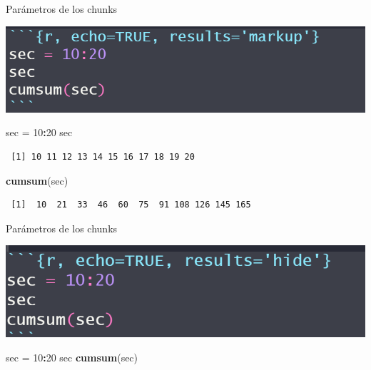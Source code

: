 \documentclass[
  ignorenonframetext,
  aspectratio=169]{beamer}
\newenvironment{Shaded}{\begin{snugshade}}{\end{snugshade}}
\newcommand{\DecValTok}[1]{\textcolor[rgb]{0.00,0.00,0.81}{#1}}
\newcommand{\FunctionTok}[1]{\textcolor[rgb]{0.13,0.29,0.53}{\textbf{#1}}}
\newcommand{\NormalTok}[1]{#1}
\newcommand{\OtherTok}[1]{\textcolor[rgb]{0.56,0.35,0.01}{#1}}
\newcommand{\SpecialCharTok}[1]{\textcolor[rgb]{0.81,0.36,0.00}{\textbf{#1}}}
\begin{document}
\begin{frame}[fragile]{Parámetros de los chunks}
\label{paruxe1metros-de-los-chunks-6}
\begin{center}\includegraphics[width=0.3\linewidth]{Imgs/para_chunks_03} \end{center}

\begin{Shaded}
\begin{Highlighting}[]
\NormalTok{sec }\OtherTok{=} \DecValTok{10}\SpecialCharTok{:}\DecValTok{20}
\NormalTok{sec}
\end{Highlighting}
\end{Shaded}

\begin{verbatim}
 [1] 10 11 12 13 14 15 16 17 18 19 20
\end{verbatim}

\begin{Shaded}
\begin{Highlighting}[]
\FunctionTok{cumsum}\NormalTok{(sec)}
\end{Highlighting}
\end{Shaded}

\begin{verbatim}
 [1]  10  21  33  46  60  75  91 108 126 145 165
\end{verbatim}
\end{frame}

\begin{frame}[fragile]{Parámetros de los chunks}
\label{paruxe1metros-de-los-chunks-7}
\begin{center}\includegraphics[width=0.3\linewidth]{Imgs/parametros_chunk_4} \end{center}

\begin{Shaded}
\begin{Highlighting}[]
\NormalTok{sec }\OtherTok{=} \DecValTok{10}\SpecialCharTok{:}\DecValTok{20}
\NormalTok{sec}
\FunctionTok{cumsum}\NormalTok{(sec)}
\end{Highlighting}
\end{Shaded}
\end{frame}
\end{document}
